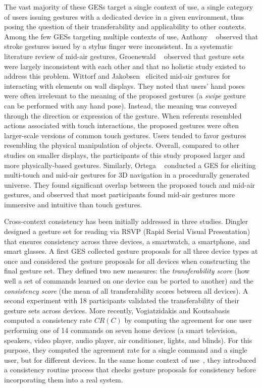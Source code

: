 The vast majority of these GESs target a single context of use, \ie a single category of users issuing gestures with a dedicated device in a given environment, thus posing the question of their transferability and applicability to other contexts. 
%
Among the few GESs targeting multiple contexts of use, Anthony \etal~\cite{Anthony:2013} observed that stroke gestures issued by a stylus \vs finger were inconsistent. In a systematic literature review of mid-air gestures, Groenewald \etal~\cite{Groenewald:2016} observed that gesture sets were largely inconsistent with each other and that no holistic study existed to address this problem.
%
Wittorf and Jakobsen~\cite{Wittorf:2016} elicited mid-air gestures for interacting with elements on wall displays. They noted that users' hand poses were often irrelevant to the meaning of the proposed gestures (\eg a \textit{swipe} gesture can be performed with any hand pose). Instead, the meaning was conveyed through the direction or expression of the gesture. When referents resembled actions associated with touch interactions, the proposed gestures were often larger-scale versions of common touch gestures. Users tended to favor gestures resembling the physical manipulation of objects. Overall, compared to other studies on smaller displays, the participants of this study proposed larger and more physically-based gestures.
%
Similarly, Ortega \etal~\cite{Ortega:2017} conducted a GES for eliciting multi-touch and mid-air gestures for 3D navigation in a procedurally generated universe. They found significant overlap between the proposed touch and mid-air gestures, and observed that most participants found mid-air gestures more immersive and intuitive than touch gestures.

Cross-context consistency has been initially addressed in three studies. Dingler \etal~\cite{Dingler:2018} designed a gesture set for reading via RSVP (Rapid Serial Visual Presentation) that ensures consistency across three devices, \ie a smartwatch, a smartphone, and smart glasses. A first GES collected gesture proposals for all three device types at once and considered the gesture proposals for all devices when constructing the final gesture set. They defined two new measures: the \textit{transferability score} (\ie how well a set of commands learned on one device can be ported to another) and the \textit{consistency score} (\ie the mean of all transferability scores between all devices). A second experiment with 18 participants validated the transferability of their gesture sets across devices. More recently, Vogiatzidakis and Koutsabasis~\cite{Vogiatzidakis:2019} computed a consistency rate $CR(C)$ by computing the agreement for one user performing one of 14 commands on seven home devices (\ie a smart television, speakers, video player, audio player, air conditioner, lights, and blinds). For this purpose, they computed the agreement rate for a single command and a single user, but for different devices. 
In the same home context of use~\cite{Vogiatzidakis:2020}, they introduced a consistency routine process that checks gesture proposals for consistency before incorporating them into a real system.


